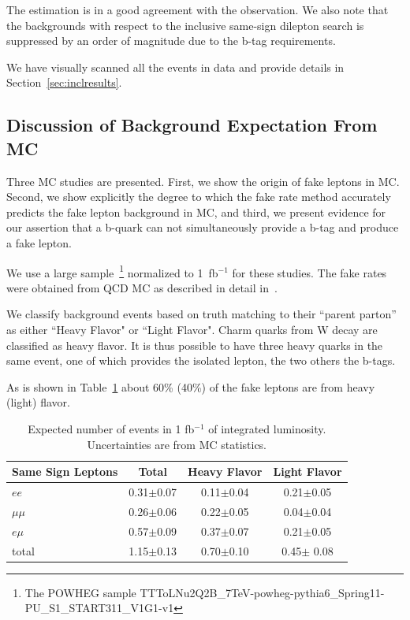 The estimation
is in a good agreement with the observation. We also note that the backgrounds with respect to the inclusive same-sign
dilepton search is suppressed by an order of magnitude due to the b-tag requirements.

We have visually scanned all the events in data and provide details in Section~\ref{sec:inclresults}.


\subsection{Discussion of Background Expectation From MC}
\label{sec:bkgdiscussion}

Three MC studies are presented. First, we show the origin of fake leptons in MC.
Second, we 
show explicitly the degree to which the fake rate method
accurately predicts the fake lepton background in \ttbar MC, 
and third, we present evidence for our assertion that a b-quark can not simultaneously provide a b-tag and produce a fake lepton.

We use a large \ttbar sample~\footnote{The POWHEG sample TTToLNu2Q2B\_7TeV-powheg-pythia6\_Spring11-PU\_S1\_START311\_V1G1-v1 } 
normalized to 1~fb$^{-1}$ for these studies. 
The fake rates were obtained from QCD MC as described in detail in~\cite{ssnote2011}.

We classify \ttbar background events based on truth matching to their ``parent parton''
as either ``Heavy Flavor" or ``Light Flavor". Charm quarks from W decay are classified as heavy flavor.
It is thus possible to have three heavy quarks in the same event, one of which provides the isolated lepton,
the two others the b-tags.

As is shown in Table~\ref{tab:fakeOrigin1}  about 60\% (40\%) of the fake leptons are from heavy (light) flavor.


\begin{table}[hbt]
\begin{center}
\begin{tabular}{|l|c|c|c|}\hline
Same Sign Leptons & Total  & Heavy Flavor & Light Flavor  \\ \hline

$ee$ & 0.31$\pm$0.07 &  0.11$\pm$0.04 & 0.21$\pm$0.05  \\
$\mu\mu$ & 0.26$\pm$0.06 & 0.22$\pm$0.05 & 0.04$\pm$0.04 \\
$e\mu$ & 0.57$\pm$0.09 & 0.37$\pm$0.07 & 0.21$\pm$0.05 \\
total & 1.15$\pm$0.13 & 0.70$\pm$0.10 & 0.45$\pm$ 0.08 \\ \hline
\end{tabular}
\caption{ Expected number of \ttbar events in 1 fb$^{-1}$ of integrated luminosity. Uncertainties are from MC statistics.\label{tab:fakeOrigin1}}
\end{center}
\end{table}

